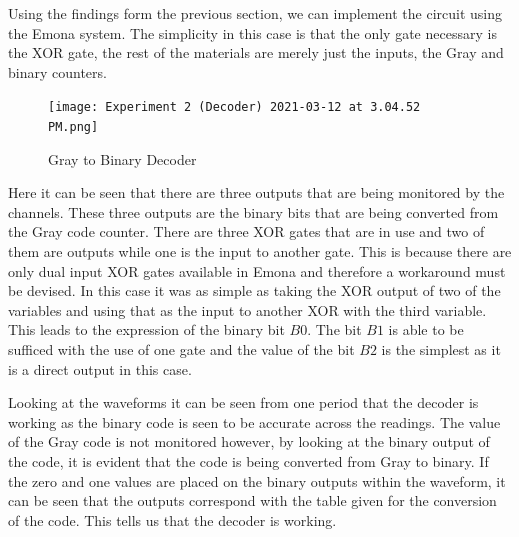 \documentclass[12pt]{article}
\begin{document}
\par Using the findings form the previous section, we can implement the circuit
using the Emona system. The simplicity in this case is that the only gate
necessary is the XOR gate, the rest of the materials are merely just the inputs,
the Gray and binary counters.
\begin{figure}[h]
    \centering
    \texttt{[image: Experiment 2 (Decoder) 2021-03-12 at
    3.04.52 PM.png]}
    \caption{Gray to Binary Decoder}
\end{figure}
\par Here it can be seen that there are three outputs that are being monitored
by the channels. These three outputs are the binary bits that are being
converted from the Gray code counter. There are three XOR gates that are in use
and two of them are outputs while one is the input to another gate. This is
because there are only dual input XOR gates available in Emona and therefore a
workaround must be devised. In this case it was as simple as taking the XOR
output of two of the variables and using that as the input to another XOR with
the third variable. This leads to the expression of the binary bit $B0$. The bit
$B1$ is able to be sufficed with the use of one gate and the value of the bit
$B2$ is the simplest as it is a direct output in this case.
\par Looking at the waveforms it can be seen from one period that the decoder is
working as the binary code is seen to be accurate across the readings. The value
of the Gray code is not monitored however, by looking at the binary output of
the code, it is evident that the code is being converted from Gray to binary. If
the zero and one values are placed on the binary outputs within the waveform, it
can be seen that the outputs correspond with the table given for the conversion
of the code. This tells us that the decoder is working.
\end{document}
